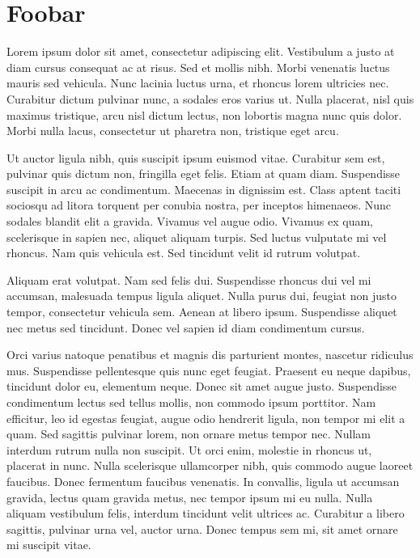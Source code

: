 \documentclass[parskip=full]{scrreprt}
\begin{document}
\chapter{Foobar}
\label{ch:foobar}

Lorem ipsum dolor sit amet, consectetur adipiscing elit. Vestibulum a justo at diam cursus consequat ac at risus. Sed et mollis nibh. Morbi venenatis luctus mauris sed vehicula. Nunc lacinia luctus urna, et rhoncus lorem ultricies nec. Curabitur dictum pulvinar nunc, a sodales eros varius ut. Nulla placerat, nisl quis maximus tristique, arcu nisl dictum lectus, non lobortis magna nunc quis dolor. Morbi nulla lacus, consectetur ut pharetra non, tristique eget arcu.

Ut auctor ligula nibh, quis suscipit ipsum euismod vitae. Curabitur sem est, pulvinar quis dictum non, fringilla eget felis. Etiam at quam diam. Suspendisse suscipit in arcu ac condimentum. Maecenas in dignissim est. Class aptent taciti sociosqu ad litora torquent per conubia nostra, per inceptos himenaeos. Nunc sodales blandit elit a gravida. Vivamus vel augue odio. Vivamus ex quam, scelerisque in sapien nec, aliquet aliquam turpis. Sed luctus vulputate mi vel rhoncus. Nam quis vehicula est. Sed tincidunt velit id rutrum volutpat.

Aliquam erat volutpat. Nam sed felis dui. Suspendisse rhoncus dui vel mi accumsan, malesuada tempus ligula aliquet. Nulla purus dui, feugiat non justo tempor, consectetur vehicula sem. Aenean at libero ipsum. Suspendisse aliquet nec metus sed tincidunt. Donec vel sapien id diam condimentum cursus.

Orci varius natoque penatibus et magnis dis parturient montes, nascetur ridiculus mus. Suspendisse pellentesque quis nunc eget feugiat. Praesent eu neque dapibus, tincidunt dolor eu, elementum neque. Donec sit amet augue justo. Suspendisse condimentum lectus sed tellus mollis, non commodo ipsum porttitor. Nam efficitur, leo id egestas feugiat, augue odio hendrerit ligula, non tempor mi elit a quam. Sed sagittis pulvinar lorem, non ornare metus tempor nec. Nullam interdum rutrum nulla non suscipit. Ut orci enim, molestie in rhoncus ut, placerat in nunc. Nulla scelerisque ullamcorper nibh, quis commodo augue laoreet faucibus. Donec fermentum faucibus venenatis. In convallis, ligula ut accumsan gravida, lectus quam gravida metus, nec tempor ipsum mi eu nulla. Nulla aliquam vestibulum felis, interdum tincidunt velit ultrices ac. Curabitur a libero sagittis, pulvinar urna vel, auctor urna. Donec tempus sem mi, sit amet ornare mi suscipit vitae.
\end{document}
